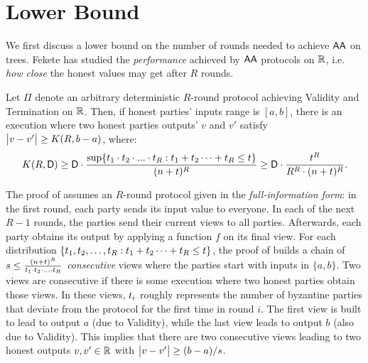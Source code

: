 \section{Lower Bound}

We first discuss a lower bound on the number of rounds needed to achieve $\textsf{AA}$ on trees. Fekete \cite{Fekete90} has studied the \emph{performance} achieved by $\textsf{AA}$ protocols on $\mathbb{R}$, i.e. \emph{how close} the honest values may get after $R$ rounds.

\begin{theorem}
\label{thm:fekete-lowerbound}
Let $\Pi$ denote an arbitrary deterministic $R$-round protocol achieving Validity and Termination on $\mathbb{R}$. Then, if honest parties' inputs range is $[a, b]$, there is an execution where two honest parties outputs' $v$ and $v'$ satisfy $\big\lvert v - v'\big\rvert \geq K(R, b - a)$, where:
\begin{align} \label{eq:fekete-performance}
    K(R, \diameter) \geq \diameter \cdot \frac{\sup \{\roundT_1 \cdot \roundT_2 \cdot ... \cdot \roundT_R : \roundT_1 + \roundT_2 \cdots + \roundT_R \leq t\}}{(n + t)^R} \geq \diameter \cdot \frac{t^R}{R^R \cdot (n + t)^R}.
\end{align}
\end{theorem}

The proof of \cite{Fekete90} assumes an $R$-round protocol given in the \emph{full-information form}: in the first round, each party sends its input value to everyone. In each of the next $R - 1$ rounds, the parties send their current views to all parties. Afterwards, each party obtains its output by applying a function $f$ on its final view. For each distribution $\{t_1, t_2, \ldots, t_R :  t_1 + t_2 \cdots + t_R \leq t\}$, the proof of \cite{Fekete90} builds a chain of $s \leq \frac{(n + t)^R}{t_1 \cdot t_2 \cdot \ldots \cdot t_R}$ \emph{consecutive} views where the parties start with inputs in $\{a, b\}$. Two views are consecutive if there is some execution where two honest parties obtain those views. In these views, $t_i$ roughly represents the number of byzantine parties that deviate from the protocol for the first time in round $i$. The first view is built to lead to output $a$ (due to Validity), while the last view leads to output $b$ (also due to Validity). This implies that there are two consecutive views leading to two honest outputs $v, v' \in \mathbb{R}$ with $\big\lvert v - v'\big\rvert \geq (b - a) / s$.


